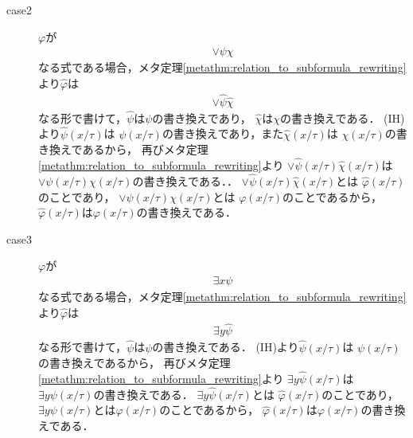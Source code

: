 \begin{metaprf}
\begin{description}
\begin{description}
					\item[case2] $\varphi$が
						\begin{align}
							\vee \psi \chi
						\end{align}
						なる式である場合，メタ定理\ref{metathm:relation_to_subformula_rewriting}より$\widehat{\varphi}$は
						\begin{align}
							\vee \widehat{\psi} \widehat{\chi}
						\end{align}
						なる形で書けて，$\widehat{\psi}$は$\psi$の書き換えであり，
						$\widehat{\chi}$は$\chi$の書き換えである．
						(IH)より$\widehat{\psi}(x/\tau)$は
						$\psi(x/\tau)$の書き換えであり，また$\widehat{\chi}(x/\tau)$は
						$\chi(x/\tau)$の書き換えであるから，
						再びメタ定理\ref{metathm:relation_to_subformula_rewriting}より
						$\vee \widehat{\psi}(x/\tau)\widehat{\chi}(x/\tau)$は
						$\vee \psi(x/\tau)\chi(x/\tau)$の書き換えである．．
						$\vee \widehat{\psi}(x/\tau)\widehat{\chi}(x/\tau)$とは
						$\widehat{\varphi}(x/\tau)$のことであり，
						$\vee \psi(x/\tau)\chi(x/\tau)$とは
						$\varphi(x/\tau)$のことであるから，
						$\widehat{\varphi}(x/\tau)$は$\varphi(x/\tau)$の書き換えである．
					
					\item[case3] $\varphi$が
						\begin{align}
							\exists x \psi
						\end{align}
						なる式である場合，メタ定理\ref{metathm:relation_to_subformula_rewriting}より$\widehat{\varphi}$は
						\begin{align}
							\exists y \widehat{\psi}
						\end{align}
						なる形で書けて，$\widehat{\psi}$は$\psi$の書き換えである．
						(IH)より$\widehat{\psi}(x/\tau)$は
						$\psi(x/\tau)$の書き換えであるから，
						再びメタ定理\ref{metathm:relation_to_subformula_rewriting}より
						$\exists y \widehat{\psi}(x/\tau)$は
						$\exists y \psi(x/\tau)$の書き換えである．
						$\exists y \widehat{\psi}(x/\tau)$とは
						$\widehat{\varphi}(x/\tau)$のことであり，
						$\exists y \psi(x/\tau)$とは$\varphi(x/\tau)$のことであるから，
						$\widehat{\varphi}(x/\tau)$は$\varphi(x/\tau)$の書き換えである．
						\QED
				\end{description}
		\end{description}
	\end{metaprf}